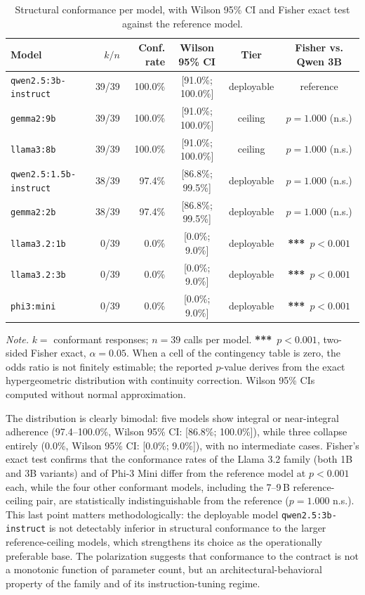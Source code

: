 \documentclass{sbc2023}%
\begin{document}
\begin{table}
\caption{Structural conformance per model, with Wilson 95\% CI and Fisher exact test against the reference model.}
\centering
\begin{tabular}{@{}lrrccc@{}}
\hline\hline
Model & $k/n$ & Conf. rate & Wilson 95\% CI & Tier & Fisher vs. Qwen 3B \\
\hline
\texttt{qwen2.5:3b-instruct} & 39/39 & 100.0\% & [91.0\%; 100.0\%] & deployable & reference \\
\texttt{gemma2:9b} & 39/39 & 100.0\% & [91.0\%; 100.0\%] & ceiling & $p=1.000$ (n.s.) \\
\texttt{llama3:8b} & 39/39 & 100.0\% & [91.0\%; 100.0\%] & ceiling & $p=1.000$ (n.s.) \\
\texttt{qwen2.5:1.5b-instruct} & 38/39 & 97.4\% & [86.8\%; 99.5\%] & deployable & $p=1.000$ (n.s.) \\
\texttt{gemma2:2b} & 38/39 & 97.4\% & [86.8\%; 99.5\%] & deployable & $p=1.000$ (n.s.) \\
\texttt{llama3.2:1b} & 0/39 & 0.0\% & [0.0\%; 9.0\%] & deployable & \textbf{***}~$p<0.001$ \\
\texttt{llama3.2:3b} & 0/39 & 0.0\% & [0.0\%; 9.0\%] & deployable & \textbf{***}~$p<0.001$ \\
\texttt{phi3:mini} & 0/39 & 0.0\% & [0.0\%; 9.0\%] & deployable & \textbf{***}~$p<0.001$ \\
\hline\hline
\end{tabular}
\label{tab:conformance}
\end{table}

\noindent\textit{Note.} $k=$ conformant responses; $n=39$ calls per model. \textbf{***}~$p<0.001$, two-sided Fisher exact, $\alpha=0.05$. When a cell of the contingency table is zero, the odds ratio is not finitely estimable; the reported $p$-value derives from the exact hypergeometric distribution with continuity correction. Wilson 95\% CIs computed without normal approximation.

The distribution is clearly bimodal: five models show integral or near-integral adherence (97.4--100.0\%, Wilson 95\% CI: [86.8\%; 100.0\%]), while three collapse entirely (0.0\%, Wilson 95\% CI: [0.0\%; 9.0\%]), with no intermediate cases. Fisher's exact test confirms that the conformance rates of the Llama 3.2 family (both 1B and 3B variants) and of Phi-3 Mini differ from the reference model at $p<0.001$ each, while the four other conformant models, including the 7--9\,B reference-ceiling pair, are statistically indistinguishable from the reference ($p=1.000$ n.s.). This last point matters methodologically: the deployable model \texttt{qwen2.5:3b-instruct} is not detectably inferior in structural conformance to the larger reference-ceiling models, which strengthens its choice as the operationally preferable base. The polarization suggests that conformance to the contract is not a monotonic function of parameter count, but an architectural-behavioral property of the family and of its instruction-tuning regime.
\end{document}
